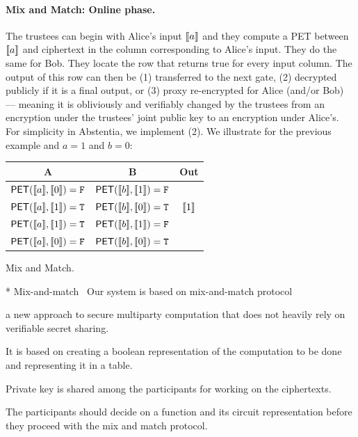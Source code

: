 \paragraph{Mix and Match: Online phase.} The trustees can begin with Alice's input $\llbracket a \rrbracket$ and they compute a PET between $\llbracket a \rrbracket$ and ciphertext in the column corresponding to Alice's input. They do the same for Bob. They locate the row that returns true for every input column. The output of this row can then be (1) transferred to the next gate, (2) decrypted publicly if it is a final output, or (3) proxy re-encrypted for Alice (and/or Bob) --- meaning it is obliviously and verifiably changed by the trustees from an encryption under the trustees' joint public key to an encryption under Alice's. For simplicity in Abstentia, we implement (2). We illustrate for the previous example and $a=1$ and $b=0$:

\begin{center}
\begin{tabular}{|c|c|c|}
  \hline
  A			& 	B			& 	Out   			\\ \hline
  $\mathsf{PET}(\llbracket a \rrbracket,\llbracket 0 \rrbracket) = \mathtt{F}$ 	&	$\mathsf{PET}(\llbracket b \rrbracket,\llbracket 1 \rrbracket) = \mathtt{F}$ 	& 	 	\\ \hline
  $\mathsf{PET}(\llbracket a \rrbracket,\llbracket 1 \rrbracket) = \mathtt{T}$ 	&	$\mathsf{PET}(\llbracket b \rrbracket,\llbracket 0 \rrbracket) = \mathtt{T}$ 	&  	$\llbracket 1 \rrbracket$  	\\ \hline
  $\mathsf{PET}(\llbracket a \rrbracket,\llbracket 1 \rrbracket) = \mathtt{T}$ 	&	$\mathsf{PET}(\llbracket b \rrbracket,\llbracket 1 \rrbracket) = \mathtt{F}$ 	&  	 	\\ \hline
  $\mathsf{PET}(\llbracket a \rrbracket,\llbracket 0 \rrbracket) = \mathtt{F}$ 	&	$\mathsf{PET}(\llbracket b \rrbracket,\llbracket 0 \rrbracket) = \mathtt{T}$ 	& 	 	\\ \hline
\end{tabular}
\end{center}

Mix and Match.

* Mix-and-match~\cite{jakobsson2000mix}
Our system is based on mix-and-match protocol

a new approach to secure multiparty computation that does not heavily rely on verifiable secret sharing. 

It is based on creating a boolean representation of the computation to be done and representing it in a table. 

Private key is shared among the participants for working on the ciphertexts. 

The participants should decide on a function and its circuit representation before they proceed with the mix and match protocol.

